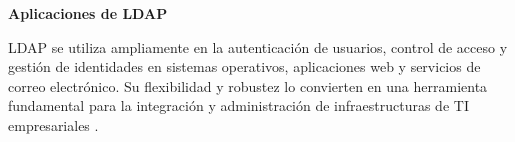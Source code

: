 \textbf{Aplicaciones de LDAP}

LDAP se utiliza ampliamente en la autenticación de usuarios, control de acceso y gestión de identidades en sistemas operativos, aplicaciones web y servicios de correo electrónico. Su flexibilidad y robustez lo convierten en una herramienta fundamental para la integración y administración de infraestructuras de TI empresariales \autocite{sermersheim_lightweight_2006,redhat_what_2022,carter_ldap_2003}.


